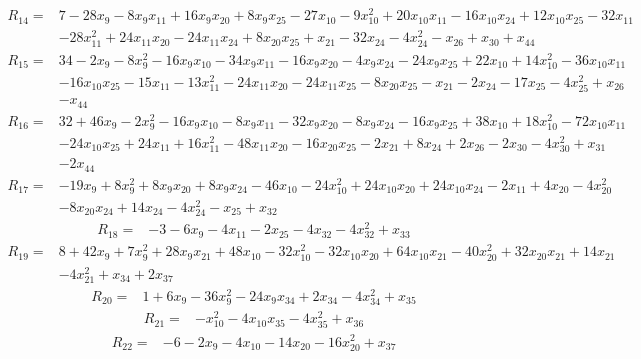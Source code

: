 \begin{align*}
 R_{14}={}&7 -28x_{9} -8x_{9}x_{11} +16x_{9}x_{20} +8x_{9}x_{25} -27x_{10} -9x_{10}^{2} +20x_{10}x_{11} -16x_{10}x_{24} +12x_{10}x_{25} -32x_{11}\\
 &-28x_{11}^{2} +24x_{11}x_{20} -24x_{11}x_{24} +8x_{20}x_{25} +x_{21} -32x_{24} -4x_{24}^{2} -x_{26} +x_{30} +x_{44}
\end{align*}
\begin{align*}
 R_{15}={}&34 -2x_{9} -8x_{9}^{2} -16x_{9}x_{10} -34x_{9}x_{11} -16x_{9}x_{20} -4x_{9}x_{24} -24x_{9}x_{25} +22x_{10} +14x_{10}^{2} -36x_{10}x_{11}\\
 &-16x_{10}x_{25} -15x_{11} -13x_{11}^{2} -24x_{11}x_{20} -24x_{11}x_{25} -8x_{20}x_{25} -x_{21} -2x_{24} -17x_{25} -4x_{25}^{2} +x_{26}\\
 &-x_{44}
\end{align*}
\begin{align*}
 R_{16}={}&32 +46x_{9} -2x_{9}^{2} -16x_{9}x_{10} -8x_{9}x_{11} -32x_{9}x_{20} -8x_{9}x_{24} -16x_{9}x_{25} +38x_{10} +18x_{10}^{2} -72x_{10}x_{11}\\
 &-24x_{10}x_{25} +24x_{11} +16x_{11}^{2} -48x_{11}x_{20} -16x_{20}x_{25} -2x_{21} +8x_{24} +2x_{26} -2x_{30} -4x_{30}^{2} +x_{31}\\
 &-2x_{44}
\end{align*}
\begin{align*}
 R_{17}={}&-19x_{9} +8x_{9}^{2} +8x_{9}x_{20} +8x_{9}x_{24} -46x_{10} -24x_{10}^{2} +24x_{10}x_{20} +24x_{10}x_{24} -2x_{11} +4x_{20} -4x_{20}^{2}\\
 &-8x_{20}x_{24} +14x_{24} -4x_{24}^{2} -x_{25} +x_{32}
\end{align*}
\begin{align*}
 R_{18}={}&-3 -6x_{9} -4x_{11} -2x_{25} -4x_{32} -4x_{32}^{2} +x_{33}
\end{align*}
\begin{align*}
 R_{19}={}&8 +42x_{9} +7x_{9}^{2} +28x_{9}x_{21} +48x_{10} -32x_{10}^{2} -32x_{10}x_{20} +64x_{10}x_{21} -40x_{20}^{2} +32x_{20}x_{21} +14x_{21}\\
 &-4x_{21}^{2} +x_{34} +2x_{37}
\end{align*}
\begin{align*}
 R_{20}={}&1 +6x_{9} -36x_{9}^{2} -24x_{9}x_{34} +2x_{34} -4x_{34}^{2} +x_{35}
\end{align*}
\begin{align*}
 R_{21}={}&-x_{10}^{2} -4x_{10}x_{35} -4x_{35}^{2} +x_{36}
\end{align*}
\begin{align*}
 R_{22}={}&-6 -2x_{9} -4x_{10} -14x_{20} -16x_{20}^{2} +x_{37}
\end{align*}
